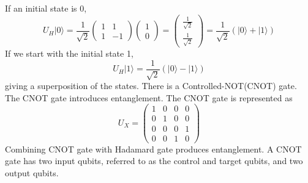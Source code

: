 \documentclass{Assignment}
\begin{document}
If an initial state is 0, 
\begin{equation}
U_H|0\rangle = \frac{1}{\sqrt{2}}
\begin{pmatrix}
	1&1\\1&-1
\end{pmatrix}\begin{pmatrix}
1\\0
\end{pmatrix}=\begin{pmatrix}
\frac{1}{\sqrt{2}}\\
\frac{1}{\sqrt{2}}
\end{pmatrix}=\frac{1}{\sqrt{2}}(|0 \rangle + |1\rangle)
\end{equation} 
If we start with the initial state 1,
$$U_H|1\rangle = \frac{1}{\sqrt{2}}(|0 \rangle - |1\rangle)$$
giving a superposition of the states.
There is a Controlled-NOT(CNOT) gate.
\\
The CNOT gate introduces entanglement.
The CNOT gate is represented as 
\begin{equation}
	U_X = \begin{pmatrix}
		1&0&0&0\\
		0&1&0&0\\
		0&0&0&1\\
		0&0&1&0
	\end{pmatrix}
\end{equation}
Combining CNOT gate with Hadamard gate produces entanglement.
A CNOT gate has two input qubits, referred to as the control and target qubits, and two output qubits. \cite{mcintyre_quantum_2012}
\end{document}
